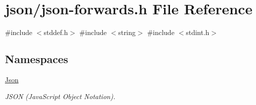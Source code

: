 \hypertarget{json-forwards_8h}{}\section{json/json-\/forwards.h File Reference}
\label{json-forwards_8h}
{\ttfamily \#include $<$stddef.\+h$>$}\newline
{\ttfamily \#include $<$string$>$}\newline
{\ttfamily \#include $<$stdint.\+h$>$}\newline
\subsection*{Namespaces}
\begin{DoxyCompactItemize}
\item 
 \hyperlink{namespaceJson}{Json}
\begin{DoxyCompactList}\small\item\em J\+S\+ON (Java\+Script Object Notation). \end{DoxyCompactList}\end{DoxyCompactItemize}
